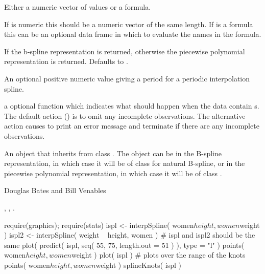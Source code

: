 %
\begin{Arguments}
\begin{ldescription}
\item[\code{obj1}] Either a numeric vector of  values or a formula.
\item[\code{obj2}] If  is numeric this should be a numeric vector
of the same length.  If  is a formula this can be an
optional data frame in which to evaluate the names in the formula.
\item[\code{bSpline}] If  the b-spline representation is returned,
otherwise the piecewise polynomial representation is returned.
Defaults to .
\item[\code{period}] An optional positive numeric value giving a period for a
periodic interpolation spline.
\item[\code{na.action}] a optional function which indicates what should happen
when the data contain s.  The default action
() is to omit any incomplete observations.  The
alternative action  causes  to print
an error message and terminate if there are any incomplete
observations.
\end{ldescription}
\end{Arguments}
%
\begin{Value}
An object that inherits from class . The object can be in
the B-spline representation, in which case it will be of class
 for natural B-spline, or in the piecewise polynomial
representation, in which case it will be of class .
\end{Value}
%
\begin{Author}\relax
Douglas Bates and Bill Venables
\end{Author}
%
\begin{SeeAlso}\relax
{},
,
.
\end{SeeAlso}
%
\begin{Examples}
\begin{ExampleCode}
require(graphics); require(stats)
ispl <- interpSpline( women$height, women$weight )
ispl2 <- interpSpline( weight ~ height,  women )
# ispl and ispl2 should be the same
plot( predict( ispl, seq( 55, 75, length.out = 51 ) ), type = "l" )
points( women$height, women$weight )
plot( ispl )    # plots over the range of the knots
points( women$height, women$weight )
splineKnots( ispl )
\end{ExampleCode}
\end{Examples}
